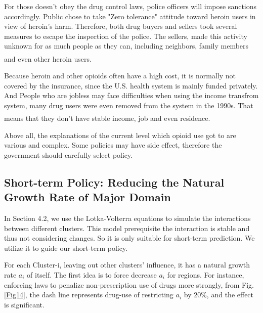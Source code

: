 \documentclass[12pt]{article}
\newcommand{\upcite}[1]{\textsuperscript{\textsuperscript{\cite{#1}}}}
\begin{document}
For those doesn't obey the drug control laws, police officers will impose sanctions accordingly. Public chose to take "Zero tolerance" attitude toward heroin users in view of heroin's harm. Therefore, both drug buyers and sellers took several measures to escape the inspection of the police. The sellers, made this activity unknown for as much people as they can, including neighbors, family members and even other heroin users\upcite{5}.

Because heroin and other opioids often have a high cost, it is normally not covered by the insurance, since the U.S. health system is mainly funded privately. And People who are jobless may face difficulties when using the income transfrom system, many drug users were even removed from the system in the 1990s. That means that they don't have stable income, job and even residence\upcite{5}.

Above all, the explanations of the current level which opioid use got to are various and complex. Some policies may have side effect, therefore the government should carefully select policy.

\subsection{Short-term Policy: Reducing the Natural Growth Rate of Major Domain}
In Section 4.2, we use the Lotka-Volterra equations to simulate the interactions between different clusters. This model prerequisite the interaction is stable and thus not considering changes. So it is only suitable for short-term prediction. We utilize it to guide our short-term policy.

For each Cluster-i, leaving out other clusters' influence, it has a natural growth rate $a_{i}$ of itself. The first idea is to force decrease $a_{i}$ for regions. For instance, enforcing laws to penalize non-prescription use of drugs more strongly, from Fig.\ref{Fig14}, the dash line represents drug-use of restricting $a_{i}$ by 20\%, and the effect is significant.
\end{document}

